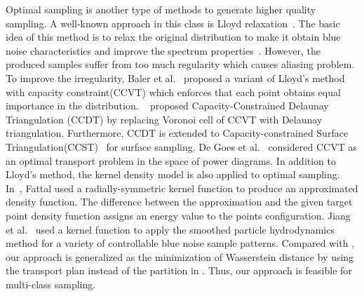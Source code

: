 Optimal sampling is another type of methods to generate higher quality sampling.
A well-known approach in this class is Lloyd relaxation~\cite{lloyd:1982:least}.
The basic idea of this method
is to relax the original distribution to make it obtain blue noise
characteristics and improve the spectrum properties~\cite{mccool:1992:hierarchical}.
However, the produced samples suffer from too much regularity which causes aliasing problem.
To improve the irregularity,
Baler et al.~ proposed a variant of Lloyd's method with capacity constraint(CCVT)
which enforces that each point obtains equal importance in the distribution.
~\cite{xu:2011:capacity} proposed Capacity-Constrained Delaunay Triangulation (CCDT) by replacing Voronoi cell of CCVT with Delaunay triangulation.
Furthermore, CCDT is extended to Capacity-constrained Surface Triangulation(CCST)~\cite{xu:2012:blue} for surface sampling.
De Goes et al.~\cite{de:2012:blue} considered CCVT as an optimal transport problem in
the space of power diagrams.
In addition to Lloyd's method,
the kernel density model is also applied to optimal sampling.
In~\cite{fattal:2011:blue},
Fattal used a radially-symmetric kernel function to produce an approximated density function.
The difference between the approximation and the given target point density function assigns an energy value to the points configuration.
Jiang et al.~ used a kernel function to apply the smoothed particle hydrodynamics method for a variety of controllable blue noise sample patterns.
Compared with \cite{de:2012:blue},
our approach is generalized as the minimization of Wasserstein distance
by using the transport plan instead of the partition in \cite{de:2012:blue}.
Thus, our approach is feasible for multi-class sampling.


